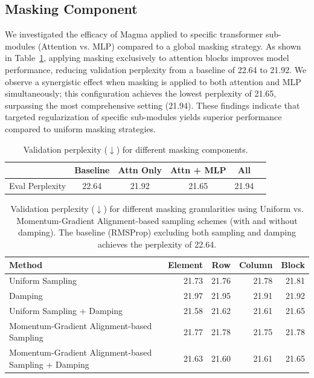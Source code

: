 \documentclass[11pt, a4paper, twocolumn, copyright, goog]{google}
\theoremstyle{plain}
\theoremstyle{definition}
\theoremstyle{remark}
\begin{document}
\subsection{Masking Component}
We investigated the efficacy of Magma applied to specific transformer sub-modules (Attention vs. MLP) compared to a global masking strategy. As shown in Table~\ref{table:masking-component}, applying masking exclusively to attention blocks improves model performance, reducing validation perplexity from a baseline of 22.64 to 21.92. We observe a synergistic effect when masking is applied to both attention and MLP simultaneously; this configuration achieves the lowest perplexity of 21.65, surpassing the most comprehensive setting (21.94). These findings indicate that targeted regularization of specific sub-modules yields superior performance compared to uniform masking strategies.

\begin{table} 
\caption{Validation perplexity ($\downarrow$) for different masking components.}
\begin{center}
\begin{tabular}{lccccc}
\toprule
& Baseline & Attn Only & Attn + MLP & All \\
\midrule
Eval Perplexity & 22.64 & 21.92 & 21.65 & 21.94 \\
\bottomrule
\end{tabular}%
\end{center}
\label{table:masking-component}
\end{table}



\begin{table}
\caption{Validation perplexity ($\downarrow$) for different masking granularities using Uniform vs. Momentum-Gradient Alignment-based sampling schemes (with and without damping). The baseline (RMSProp) excluding both sampling and damping achieves the perplexity of 22.64.}
\begin{center}
\begin{tabular}{lrrrr}
\toprule
Method & Element & Row & Column & Block \\
\midrule  
Uniform Sampling  & 21.73 & 21.76 & 21.78 & 21.81 \\
Damping & 21.97 & 21.95 & 21.91 & 21.92 \\
Uniform Sampling + Damping  & 21.58 & 21.62 & 21.61 & 21.65 \\
Momentum-Gradient Alignment-based Sampling & 21.77 & 21.78 & 21.75 & 21.78 \\
Momentum-Gradient Alignment-based Sampling + Damping & 21.63  & 21.60 & 21.61 & 21.65 \\
\bottomrule
\end{tabular}%
\end{center}
\label{table:masking-granularity}
\end{table}
\end{document}
